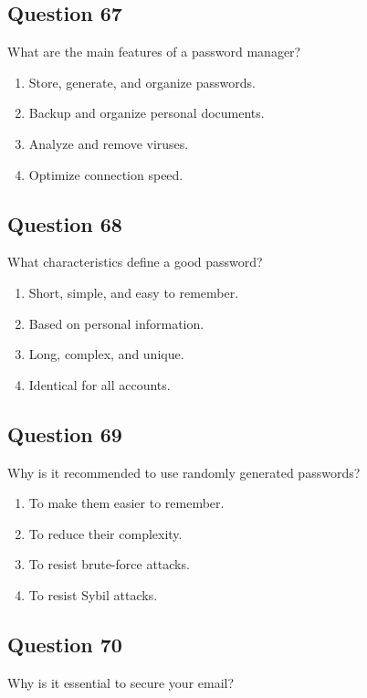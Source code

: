 \documentclass[12pt,a4paper]{article}
\begin{document}
\subsection*{Question 67}
What are the main features of a password manager?

\begin{enumerate}[label=\Alph*., leftmargin=*]
\item Store, generate, and organize passwords.
\item Backup and organize personal documents.
\item Analyze and remove viruses.
\item Optimize connection speed.
\end{enumerate}

\bigskip


\subsection*{Question 68}
What characteristics define a good password?

\begin{enumerate}[label=\Alph*., leftmargin=*]
\item Short, simple, and easy to remember.
\item Based on personal information.
\item Long, complex, and unique.
\item Identical for all accounts.
\end{enumerate}

\bigskip


\subsection*{Question 69}
Why is it recommended to use randomly generated passwords?

\begin{enumerate}[label=\Alph*., leftmargin=*]
\item To make them easier to remember.
\item To reduce their complexity.
\item To resist brute-force attacks.
\item To resist Sybil attacks.
\end{enumerate}

\bigskip


\subsection*{Question 70}
Why is it essential to secure your email?
\end{document}
